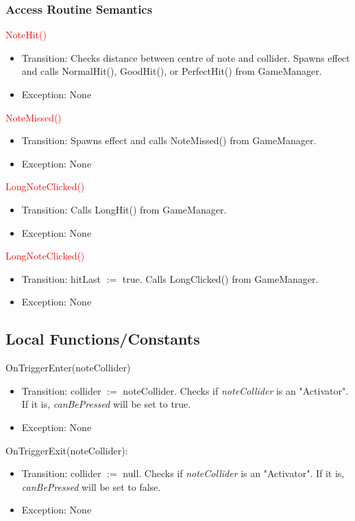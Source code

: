 \documentclass[12pt]{article}
\begin{document}
\subsubsection {Access Routine Semantics}

\noindent \textcolor{red}{NoteHit()}
\begin{itemize}
    \item Transition: Checks distance between centre of note and collider. Spawns effect and calls NormalHit(), GoodHit(), or PerfectHit() from GameManager.
    \item Exception: None
\end{itemize}

\noindent \textcolor{red}{NoteMissed()}
\begin{itemize}
    \item Transition: Spawns effect and calls NoteMissed() from GameManager.
    \item Exception: None
\end{itemize}

\noindent \textcolor{red}{LongNoteClicked()}
\begin{itemize}
    \item Transition: Calls LongHit() from GameManager.
    \item Exception: None
\end{itemize}

\noindent \textcolor{red}{LongNoteClicked()}
\begin{itemize}
    \item Transition: hitLast $:=$ true. Calls LongClicked() from GameManager.
    \item Exception: None
\end{itemize}

\subsection{Local Functions/Constants}

\noindent OnTriggerEnter(noteCollider)
\begin{itemize}
    \item Transition: collider $:=$ noteCollider. Checks if \textit{noteCollider} is an "Activator". If it is, \textit{canBePressed} will be set to true.
    \item Exception: None
\end{itemize}

\noindent OnTriggerExit(noteCollider):
\begin{itemize}
    \item Transition: collider $:=$ null. Checks if \textit{noteCollider} is an "Activator". If it is, \textit{canBePressed} will be set to false.
    \item Exception: None
\end{itemize}
\medskip
\end{document}
